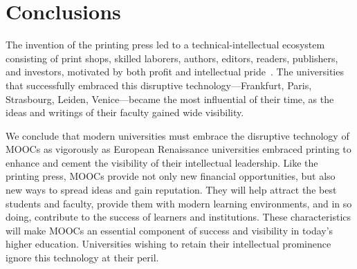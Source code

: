 \section{Conclusions}




The invention of the printing press led to a
technical-intellectual ecosystem consisting of print shops, skilled
laborers, authors, editors, readers, publishers, and investors,
motivated by both profit and intellectual pride~\cite{febvre}.
The universities that successfully embraced this disruptive
technology---Frankfurt, Paris, 
Strasbourg, Leiden, Venice---became the most influential of their
time, as the ideas and writings of their faculty gained wide visibility.

We conclude that modern universities must embrace the disruptive
technology of MOOCs
as vigorously as European Renaissance universities
embraced printing to enhance and cement the
visibility of their intellectual leadership.
Like the printing press, 
MOOCs provide  not only new financial opportunities,
but also new ways to spread ideas and gain reputation. 
They will help attract the best students and
faculty, provide them with modern learning environments, and in so doing,
contribute to the success of learners and institutions.
These characteristics will make MOOCs an
essential component of success and visibility in today's higher
education. 
Universities wishing to retain their intellectual
prominence ignore this technology at their peril.




